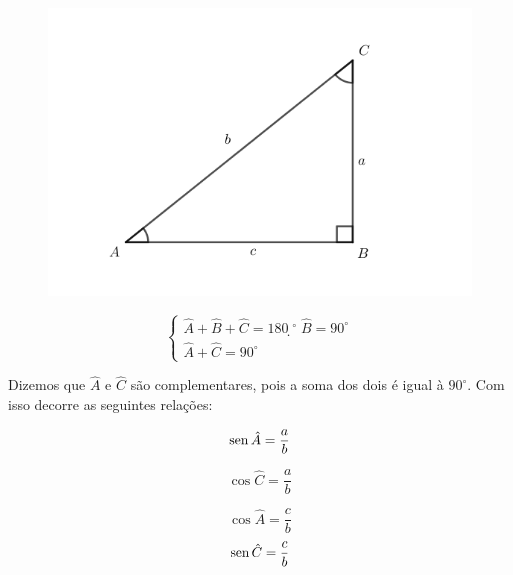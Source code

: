 \begin{figure}[H]
	\centering
	
	\includegraphics[scale=3.5]{imagens/triangulo-retangulo.png}

\end{figure}


$$
\begin{cases}
\hat{A}+\hat{B}+\hat{C}=180̣^{\circ}
\hat{B} = 90^{\circ}\\
\hat{A} + \hat{C} = 90^{\circ}
\end{cases}
$$

Dizemos que $\hat{A} $ e $ \hat{C} $ são complementares, pois a soma dos dois é igual à $90^{\circ}$. Com isso decorre as seguintes relações:

$$\operatorname{sen}\hat{A} = \dfrac{a}{b}$$

$$\cos\hat{C} = \dfrac{a}{b}$$
\centering
{}



$$\cos\hat{A} = \dfrac{c}{b}$$
$$\operatorname{sen}\hat{C} = \dfrac{c}{b}$$
\centering
{}

\newpage










